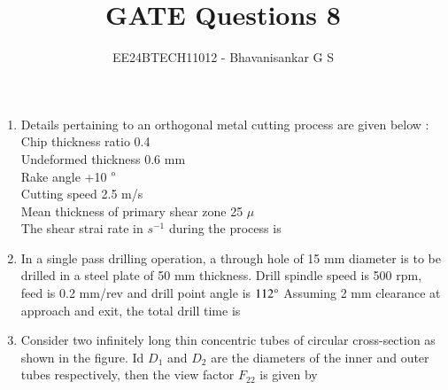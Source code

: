 \documentclass[journal,12pt,onecolumn]{IEEEtran}
\theoremstyle{remark}
\begin{document}

\vspace{3cm}

\title{GATE Questions 8}
\author{EE24BTECH11012 - Bhavanisankar G S}
\maketitle
\newpage
\bigskip

\renewcommand{\thefigure}{\theenumi}
\renewcommand{\thetable}{\theenumi}
\begin{enumerate}
	\item Details pertaining to an orthogonal metal cutting process are given below :\\
		Chip thickness ratio 	0.4 \\
		Undeformed thickness 	0.6 mm \\
		Rake angle 	+10 $\degree$ \\
		Cutting speed 	2.5 m/s \\
		Mean thickness of primary shear zone 	25 $\mu$ \\
	The shear strai rate in $s^{-1}$ during the process is
		\begin{enumerate}
		\end{enumerate}
	\item In a single pass drilling operation, a through hole of 15 mm diameter is to be drilled in a steel plate of 50 mm thickness. Drill spindle speed is 500 rpm, feed is 0.2 mm/rev and drill point angle is $112 \degree$ Assuming 2 mm clearance at approach and exit, the total drill time  is
		\begin{enumerate}
				\begin{multicols}{4}
				\item 35.1
				\item 32.4
				\item 31.2
				\item 30.1
				\end{multicols}
		\end{enumerate}
	\item Consider two infinitely long thin concentric tubes of circular cross-section as shown in the figure. Id $D_1$ and $D_2$ are the diameters of the inner and outer tubes respectively, then the view factor $F_{22}$ is given by

\end{enumerate}
\end{document}
